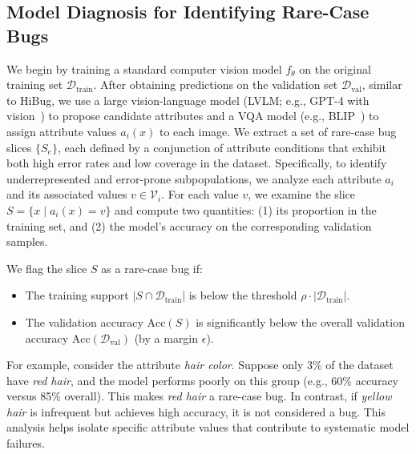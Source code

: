 \documentclass[10pt]{article} %
\newcommand{\hibug}{HiBug\xspace}
\begin{document}
\subsection{Model Diagnosis for Identifying Rare-Case Bugs}
We begin by training a standard computer vision model \(f_\theta\) on the original training set \(\mathcal{D}_{\mathrm{train}}\). After obtaining predictions on the validation set \(\mathcal{D}_{\mathrm{val}}\), similar to \hibug{}, we use a large vision-language model (LVLM; e.g., GPT-4 with vision~\citep{openai2023gpt4}) to propose candidate attributes and a VQA model (e.g., BLIP~\citep{li2022blip}) to assign attribute values \(a_i(x)\) to each image. We extract a set of rare-case bug slices \(\{S_e\}\), each defined by a conjunction of attribute conditions that exhibit both high error rates and low coverage in the dataset. Specifically, to identify underrepresented and error-prone subpopulations, we analyze each attribute \(a_i\) and its associated values \(v \in \mathcal{V}_i\). For each value \(v\), we examine the slice \(S = \{x \mid a_i(x) = v\}\) and compute two quantities: (1) its proportion in the training set, and (2) the model’s accuracy on the corresponding validation samples.

\noindent We flag the slice \(S\) as a rare-case bug if:
\begin{itemize}
    \item The training support \(|S \cap \mathcal{D}_{\mathrm{train}}|\) is below the threshold \(\rho \cdot |\mathcal{D}_{\mathrm{train}}|\).
    \item The validation accuracy \(\mathrm{Acc}(S)\) is significantly below the overall validation accuracy \(\mathrm{Acc}(\mathcal{D}_{\mathrm{val}})\) (by a margin \(\epsilon\)).
\end{itemize}
For example, consider the attribute \textit{hair color}. Suppose only 3\% of the dataset have \textit{red hair}, and the model performs poorly on this group (e.g., 60\% accuracy versus 85\% overall). This makes \textit{red hair} a rare-case bug. In contrast, if \textit{yellow hair} is infrequent but achieves high accuracy, it is not considered a bug. This analysis helps isolate specific attribute values that contribute to systematic model failures.

\end{document}

